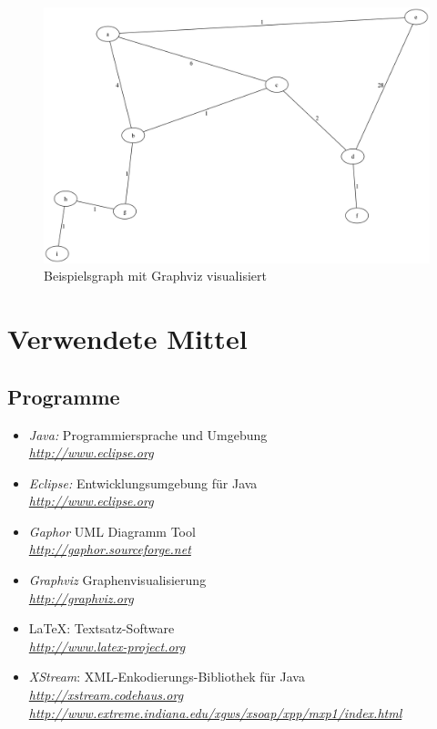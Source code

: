 \documentclass[a4paper,titlepage]{article}
\begin{document}
\begin{figure}[h!]
\begin{center}
\includegraphics[width=\textwidth]{screenshot/example_dot.png}
\end{center}
\caption{Beispielsgraph mit Graphviz visualisiert}
\end{figure}

\newpage

\section{Verwendete Mittel}

\subsection{Programme}

\begin{itemize}
\item \emph{Java:} Programmiersprache und Umgebung \\
	\emph{\href{http://www.eclipse.org}{http://www.eclipse.org}}
	\item \emph{Eclipse:} Entwicklungsumgebung für Java \\
		\emph{\href{http://www.eclipse.org}{http://www.eclipse.org}}
\item \emph{Gaphor} UML Diagramm Tool \\
	\emph{\href{http://gaphor.sourceforge.net}{http://gaphor.sourceforge.net}}
\item \emph{Graphviz} Graphenvisualisierung \\
	\emph{\href{http://graphviz.org}{http://graphviz.org}}
\item \LaTeX: Textsatz-Software \\
	\emph{\href{http://www.latex-project.org}{http://www.latex-project.org}}
\item \emph{XStream}: XML-Enkodierungs-Bibliothek für Java \\
	\emph{\href{http://xstream.codehaus.org}{http://xstream.codehaus.org}} \\
	\emph{\href{http://www.extreme.indiana.edu/xgws/xsoap/xpp/mxp1/index.html}{http://www.extreme.indiana.edu/xgws/xsoap/xpp/mxp1/index.html}}
\end{itemize}
\end{document}
